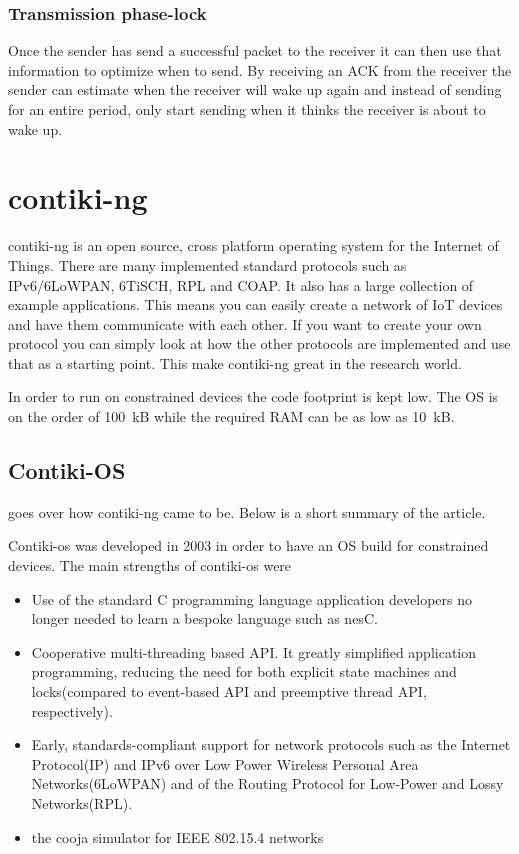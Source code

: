 \subsubsection{Transmission phase-lock}
Once the sender has send a successful packet to the receiver it can then use that information to optimize when to send. By receiving an ACK from the receiver the sender can estimate when the receiver will wake up again and instead of sending for an entire period, only start sending when it thinks the receiver is about to wake up. 



\section{contiki-ng}

contiki-ng is an open source, cross platform operating system for the Internet of Things. There are many implemented standard protocols such as IPv6/6LoWPAN, 6TiSCH, RPL and COAP. It also has a large collection of example applications. This means you can easily create a network of IoT devices and have them communicate with each other. If you want to create your own protocol you can simply look at how the other protocols are implemented and use that as a starting point. This make contiki-ng great in the research world.

In order to run on constrained devices the code footprint is kept low. The OS is on the order of 100~kB while the required RAM can be as low as 10~kB. 

\subsection{Contiki-OS}
\Cite{oikonomouContikiNGOpenSource2022a} goes over how contiki-ng came to be. Below is a short summary of the article.

Contiki-os was developed in 2003 in order to have an OS build for constrained devices. The main strengths of contiki-os were 
\begin{itemize}
    \item Use of the standard C programming language application developers no longer needed to learn a bespoke language such as nesC.
    \item Cooperative multi-threading based API. It greatly simplified application programming, reducing the need for both explicit state machines and locks(compared to event-based API and preemptive thread API, respectively).
    \item Early, standards-compliant support for network protocols such as the Internet Protocol(IP) and IPv6 over Low Power Wireless Personal Area Networks(6LoWPAN) and of the Routing Protocol for Low-Power and Lossy Networks(RPL).
    \item the cooja simulator for IEEE 802.15.4 networks
\end{itemize}

